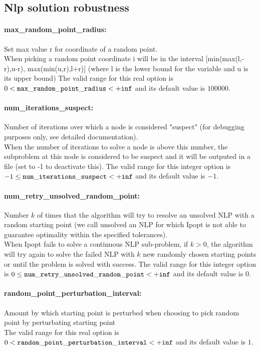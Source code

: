 \subsection{Nlp solution robustness}
\label{sec:Nlp_solution_robustness}
\paragraph{max\_random\_point\_radius:} Set max value r for coordinate of a random point. $\;$ \\
 When picking a random point coordinate i will be
in the interval [min(max(l,-r),u-r),
max(min(u,r),l+r)] (where l is the lower bound
for the variable and u is its upper bound) The valid range for this real option is 
$0 <  {\tt max\_random\_point\_radius } <  {\tt +inf}$
and its default value is $100000$.


\paragraph{num\_iterations\_suspect:} Number of iterations over which a node is considered "suspect" (for debugging purposes only, see detailed documentation). $\;$ \\
 When the number of iterations to solve a node is
above this number, the subproblem at this node is
considered to be suspect and it will be outputed
in a file (set to -1 to deactivate this). The valid range for this integer option is
$-1 \le {\tt num\_iterations\_suspect } <  {\tt +inf}$
and its default value is $-1$.


\paragraph{num\_retry\_unsolved\_random\_point:} Number $k$ of times that the algorithm will try to resolve an unsolved NLP with a random starting point (we call unsolved an NLP for which Ipopt is not able to guarantee optimality within the specified tolerances). $\;$ \\
 When Ipopt fails to solve a continuous NLP
sub-problem, if $k > 0$, the algorithm will try
again to solve the failed NLP with $k$ new
randomly chosen starting points  or until the
problem is solved with success. The valid range for this integer option is
$0 \le {\tt num\_retry\_unsolved\_random\_point } <  {\tt +inf}$
and its default value is $0$.


\paragraph{random\_point\_perturbation\_interval:} Amount by which starting point is perturbed when choosing to pick random point by perturbating starting point $\;$ \\
 The valid range for this real option is 
$0 <  {\tt random\_point\_perturbation\_interval } <  {\tt +inf}$
and its default value is $1$.


